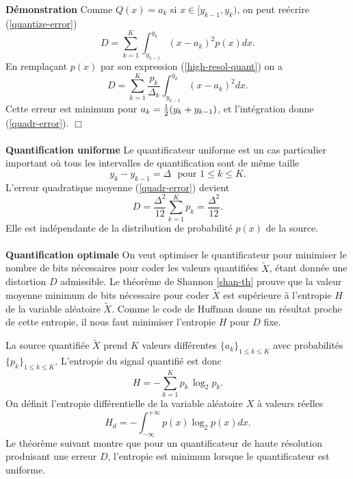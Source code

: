 {\bf D\'emonstration} Comme $Q(x) = a_k$ si 
$x \in [y_{k-1},y_k)$, on peut re\'ecrire (\ref{quantize-error}) 
\[
D = \sum_{k=1}^{K} \int_{y_{k-1}}^{y_{k}} (x - a_k)^2 p(x) dx .
\]
En rempla\c{c}ant $p(x)$ par son expression 
(\ref{high-resol-quant}) on a
\begin{equation}
D = 
\sum_{k=1}^{K} \frac {p_k} {\Delta_k}
\int_{y_{k-1}}^{y_{k}} (x - a_k)^2  dx.
\end{equation}
Cette erreur est minimum 
pour $a_k = {\frac 1 2} (y_{k}+{y_{k-1}})$, et l'int\'egration donne
(\ref{quadr-error}).
$\Box$
\\
\\
{\bf Quantification uniforme}
Le quantificateur uniforme est un cas particulier important o\`u
tous les intervalles de quantification sont de m\^eme taille
\[
y_{k} - y_{k-1} = \Delta ~~~\mbox{pour $1 \leq k \leq K$} .
\] 
L'erreur quadratique moyenne (\ref{quadr-error}) 
devient
\begin{equation}
\label{unifoquantiz}
D = \frac {\Delta^2} {12} \sum_{k=1}^{K} {p_k}
= \frac {\Delta^2} {12} .
\end{equation}
Elle est ind\'ependante de la distribution de probabilit\'e 
$p(x)$ de la source.
\\
\\
{\bf Quantification optimale}
On veut optimiser 
le quantificateur pour minimiser le nombre de bits
n\'ecessaires pour coder les valeurs quantifi\'ees
$\tilde X$, \'etant donn\'ee une distortion $D$ admissible.
Le th\'eor\`eme de
Shannon \ref{shan-th} prouve que la valeur moyenne minimum de bits
n\'ecessaire pour coder $\tilde X$ est sup\'erieure \`a l'entropie $H$
de la variable al\'eatoire $\tilde X$.
Comme le
code de Huffman donne un r\'esultat proche de cette entropie,
il nous faut minimiser l'entropie $H$ pour $D$ fixe.

La source quantifi\'ee $\tilde X$ prend $K$ valeurs diff\'erentes
$\{a_k\}_{1 \leq k \leq K}$ avec probabilit\'es 
$\{p_k\}_{1 \leq k \leq K}$.
L'entropie du signal quantifi\'e est donc
\[
H = - \sum_{k=1}^K p_k\, \log_2 p_k .
\]
On d\'efinit l'entropie diff\'erentielle de la variable al\'eatoire
$X$ \`a valeurs r\'eelles 
\begin{equation}
\label{entropie-dffD}
H_d = - \int_{-\infty}^{+\infty} p(x) \log_2 p(x) dx .
\end{equation}
Le th\'eor\`eme suivant montre que pour un quantificateur de haute
r\'esolution produisant une erreur $D$, 
l'entropie est minimum lorsque le quantificateur est
uniforme.

